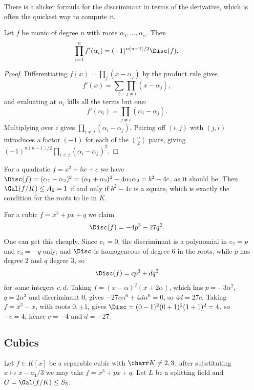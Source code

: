 There is a slicker formula for the discriminant in terms of the derivative, which is often the quickest way to compute it.

\begin{proposition}\label{prop:discderiv}
	Let $f$ be monic of degree $n$ with roots $\alpha_1,\dots,\alpha_n$. Then
	$$\prod_{i=1}^n f'(\alpha_i) = (-1)^{n(n-1)/2}\Disc(f).$$
\end{proposition}

\begin{proof}
	Differentiating $f(x) = \prod_j (x-\alpha_j)$ by the product rule gives
	$$f'(x) = \sum_i \prod_{j\neq i}(x-\alpha_j),$$
	and evaluating at $\alpha_i$ kills all the terms but one:
	$$f'(\alpha_i) = \prod_{j \neq i}(\alpha_i - \alpha_j).$$
	Multiplying over $i$ gives $\prod_{i\neq j}(\alpha_i-\alpha_j)$. Pairing off $(i,j)$ with $(j,i)$ introduces a factor $(-1)$ for each of the $\binom{n}{2}$ pairs, giving $(-1)^{n(n-1)/2}\prod_{i<j}(\alpha_i-\alpha_j)^2$.
\end{proof}

\begin{example}
	For a quadratic $f = x^2+bx+c$ we have $\Disc(f) = (\alpha_1-\alpha_2)^2 = (\alpha_1+\alpha_2)^2 - 4\alpha_1\alpha_2 = b^2-4c$, as it should be. Then $\Gal(f/K) \leq A_2 = 1$ if and only if $b^2-4c$ is a square, which is exactly the condition for the roots to lie in $K$.
\end{example}

\begin{example}\label{ex:disccubic}
	For a cubic $f = x^3 + px + q$ we claim
	$$\Disc(f) = -4p^3 - 27q^2.$$
	One can get this cheaply. Since $e_1 = 0$, the discriminant is a polynomial in $e_2 = p$ and $e_3 = -q$ only; and $\Disc$ is homogeneous of degree $6$ in the roots, while $p$ has degree $2$ and $q$ degree $3$, so
	$$\Disc(f) = cp^3 + dq^2$$
	for some integers $c,d$. Taking $f = (x-\alpha)^2(x+2\alpha)$, which has $p = -3\alpha^2$, $q = 2\alpha^3$ and discriminant $0$, gives $-27c\alpha^6 + 4d\alpha^6 = 0$, so $4d = 27c$. Taking $f = x^3 - x$, with roots $0, \pm1$, gives $\Disc = (0-1)^2(0+1)^2(1+1)^2 = 4$, so $-c = 4$; hence $c = -4$ and $d = -27$.
\end{example}

\subsection{Cubics}

Let $f \in K[x]$ be a separable cubic with $\charr K \neq 2, 3$; after substituting $x \mapsto x - a_1/3$ we may take $f = x^3+px+q$. Let $L$ be a splitting field and $G = \Gal(f/K) \leq S_3$.

